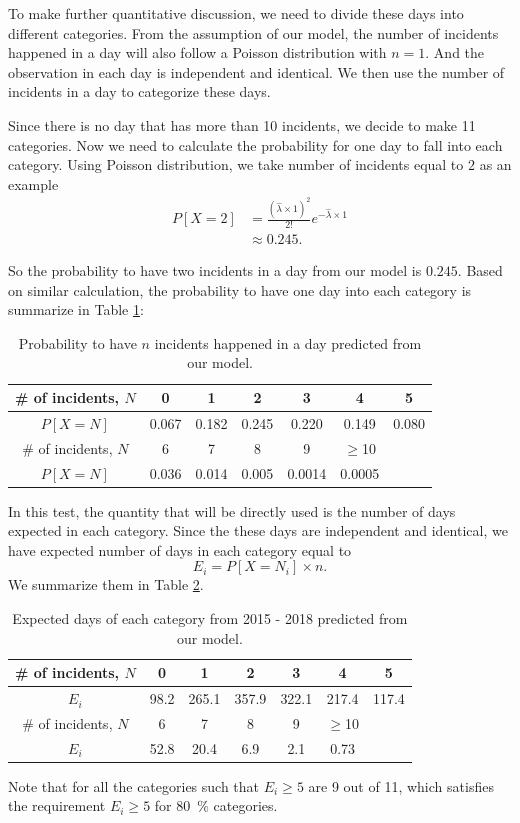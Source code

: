 \documentclass[11pt,a4paper,english]{article}
\begin{document}
To make further quantitative discussion, we need to divide these days into different categories. 
From the assumption of our model, the number of incidents happened in a day will also follow a Poisson distribution with $n = 1$. 
And the observation in each day is independent and identical. We then use the number of incidents in a day to categorize these days.

Since there is no day that has more than 10 incidents, we decide to make 11 categories. Now we need to calculate the probability for one day to fall into each category. Using Poisson distribution, we take number of incidents equal to $2$ as an example
\begin{align*}
	P[X = 2] &= \frac{\left(\hat{\lambda}\times 1\right)^{2}}{2!}
	e^{-\hat{\lambda} \times 1} \\
	&\approx 0.245.
\end{align*}

So the probability to have two incidents in a day from our model is $0.245$.
Based on similar calculation, the probability to have one day into each category is summarize in Table \ref{tab:prob}:
\begin{table}[htbp]
    \centering
	\begin{tabular}{c|cccccc}
		\hline
		\# of incidents, $N$ & 0 & 1 & 2 & 3 & 4 & 5\\
		\hline
		$P[X = N]$ & 0.067 & 0.182 & 0.245 & 0.220 & 0.149 & 0.080\\ 
		\hline
		\# of incidents, $N$  & 6 & 7 & 8 & 9 & $\geq$10 & \\
		\hline
		$P[X = N]$  & 0.036 & 0.014 & 0.005 & 0.0014 & 0.0005 & \\ 
		\hline
    \end{tabular}
	\caption{Probability to have $n$ incidents happened in a day predicted from our model.}
	\label{tab:prob}
\end{table}

In this test, the quantity that will be directly used is the number of days expected in each category. Since the these days are independent and identical, we have expected number of days in each category equal to
\begin{equation*}
	E_{i} = P[X = N_{i}] \times n.
\end{equation*}
We summarize them in Table \ref{tab:expect}.
\begin{table}[htbp]
    \centering
	\begin{tabular}{c|cccccc}
		\hline
		\# of incidents, $N$ & 0 & 1 & 2 & 3 & 4 & 5\\
		\hline
		$E_{i}$ & 98.2 & 265.1 & 357.9 & 322.1 & 217.4 & 117.4\\ 
		\hline
		\# of incidents, $N$  & 6 & 7 & 8 & 9 & $\geq$10 & \\
		\hline
		$E_{i}$  & 52.8 & 20.4 & 6.9 & 2.1 & 0.73 & \\ 
		\hline
    \end{tabular}
	\caption{Expected days of each category from 2015 - 2018 predicted from our model.}
	\label{tab:expect}
\end{table}
Note that for all the categories such that $E_{i} \geq 5$ are 9 out of 11, which satisfies the requirement $E_{i} \geq 5$ for \SI{80}{\percent} categories.
\end{document}

